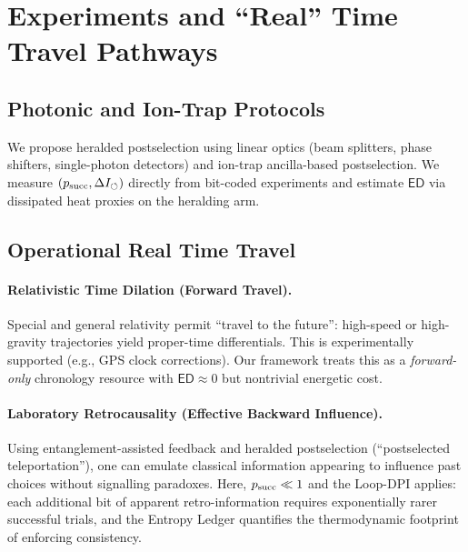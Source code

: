 
\section{Experiments and ``Real'' Time Travel Pathways}
\subsection{Photonic and Ion-Trap Protocols}
We propose heralded postselection using linear optics (beam splitters, phase shifters, single-photon detectors) and ion-trap ancilla-based postselection. We measure $(p_{\mathrm{succ}},\Delta I_{\circlearrowleft})$ directly from bit-coded experiments and estimate $\mathsf{ED}$ via dissipated heat proxies on the heralding arm.

\subsection{Operational Real Time Travel}
\paragraph{Relativistic Time Dilation (Forward Travel).} Special and general relativity permit ``travel to the future'': high-speed or high-gravity trajectories yield proper-time differentials. This is experimentally supported (e.g., GPS clock corrections). Our framework treats this as a \emph{forward-only} chronology resource with $\mathsf{ED}\approx 0$ but nontrivial energetic cost.

\paragraph{Laboratory Retrocausality (Effective Backward Influence).} Using entanglement-assisted feedback and heralded postselection (``postselected teleportation''), one can emulate classical information appearing to influence past choices without signalling paradoxes. Here, $p_{\mathrm{succ}}\ll 1$ and the Loop-DPI applies: each additional bit of apparent retro-information requires exponentially rarer successful trials, and the Entropy Ledger quantifies the thermodynamic footprint of enforcing consistency.
